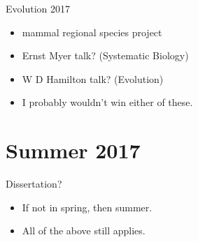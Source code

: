 \documentclass{article}
\begin{document}
Evolution 2017
\begin{itemize}
  \item mammal regional species project
  \item Ernst Myer talk? (Systematic Biology)
  \item W D Hamilton talk? (Evolution)
  \item I probably wouldn't win either of these.
\end{itemize}


\section{Summer 2017}
Dissertation?
\begin{itemize}
  \item If not in spring, then summer.
  \item All of the above still applies.
\end{itemize}
\end{document}
